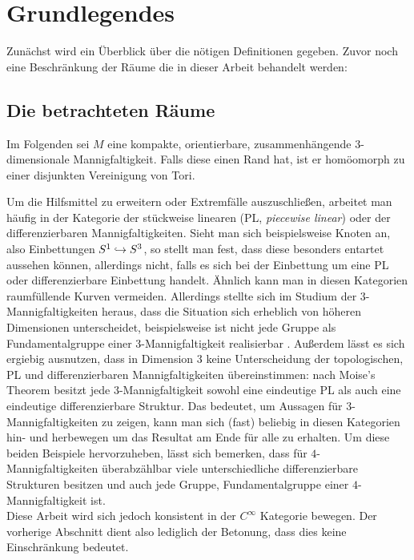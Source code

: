 \section{Grundlegendes}
\label{sec:defs}
    Zunächst wird ein Überblick über die nötigen Definitionen gegeben. Zuvor noch eine Beschränkung der Räume die in dieser Arbeit behandelt werden:


    \subsection{Die betrachteten Räume}
        Im Folgenden sei $M$ eine kompakte, orientierbare, zusammenhängende $3$-dimensionale Mannigfaltigkeit. Falls diese einen Rand hat, ist er homöomorph zu einer disjunkten Vereinigung von Tori.

        Um die Hilfsmittel zu erweitern oder Extremfälle auszuschließen, arbeitet man häufig in der Kategorie der stückweise linearen (PL, \textit{piecewise linear}) oder der differenzierbaren Mannigfaltigkeiten. Sieht man sich beispielsweise Knoten an, also Einbettungen $S^1 \hookrightarrow S^3$, so stellt man fest, dass diese besonders entartet aussehen können, allerdings nicht, falls es sich bei der Einbettung um eine PL oder differenzierbare Einbettung handelt. Ähnlich kann man in diesen Kategorien raumfüllende Kurven vermeiden. Allerdings stellte sich im Studium der $3$-Mannigfaltigkeiten heraus, dass die Situation sich erheblich von höheren Dimensionen unterscheidet, beispielsweise ist nicht jede Gruppe als Fundamentalgruppe einer $3$-Mannigfaltigkeit realisierbar . Außerdem lässt es sich ergiebig ausnutzen, dass in Dimension $3$ keine Unterscheidung der topologischen, PL und differenzierbaren Mannigfaltigkeiten übereinstimmen: nach Moise's Theorem besitzt jede $3$-Mannigfaltigkeit sowohl eine eindeutige PL als auch eine eindeutige differenzierbare Struktur. Das bedeutet, um Aussagen für $3$-Mannigfaltigkeiten zu zeigen, kann man sich (fast) beliebig in diesen Kategorien hin- und herbewegen um das Resultat am Ende für alle zu erhalten. Um diese beiden Beispiele hervorzuheben, lässt sich bemerken, dass für $4$-Mannigfaltigkeiten überabzählbar viele unterschiedliche differenzierbare Strukturen besitzen und auch jede Gruppe, Fundamentalgruppe einer $4$-Mannigfaltigkeit ist.\\
        Diese Arbeit wird sich jedoch konsistent in der $C^\infty$ Kategorie bewegen. Der vorherige Abschnitt dient also lediglich der Betonung, dass dies keine Einschränkung bedeutet. 


